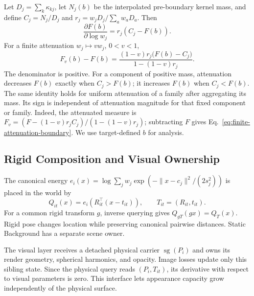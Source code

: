 Let $D_j=\sum_k\kappa_{kj}$, let $N_j(b)$ be the interpolated pre-boundary kernel mass, and define
$C_j=N_j/D_j$ and $r_j=w_jD_j/\sum_a w_aD_a$.
Then
\begin{equation}
\frac{\partial F(b)}{\partial\log w_j}=r_j(C_j-F(b)).
\label{eq:attenuation-sign-boundary}
\end{equation}
For a finite attenuation $w_j\mapsto vw_j$, $0<v<1$,
\begin{equation}
F_v(b)-F(b)=
\frac{(1-v)r_j\bigl(F(b)-C_j\bigr)}{1-(1-v)r_j}.
\label{eq:finite-attenuation-boundary}
\end{equation}
The denominator is positive. For a component of positive mass, attenuation decreases $F(b)$ exactly
when $C_j>F(b)$; it increases $F(b)$ when $C_j<F(b)$.
The same identity holds for uniform attenuation of a family after aggregating its mass.
Its sign is independent of attenuation magnitude for that fixed component or family.
Indeed, the attenuated measure is $F_v=(F-(1-v)r_jC_j)/(1-(1-v)r_j)$;
subtracting $F$ gives Eq.~\ref{eq:finite-attenuation-boundary}.
We use target-defined $b$ for analysis.

\subsection{Rigid Composition and Visual Ownership}

The canonical energy $e_i(x)=\log\sum_j w_j\exp(-\|x-c_j\|^2/(2s_j^2))$ is placed in the world by
\begin{equation}
Q_{it}(x)=e_i\!\left(R_{it}^{\top}(x-t_{it})\right),
\qquad T_{it}=(R_{it},t_{it}).
\label{eq:authority-query}
\end{equation}
For a common rigid transform $g$, inverse querying gives $Q_{gT}(gx)=Q_T(x)$.
Rigid pose changes location while preserving canonical pairwise distances.
Static Background has a separate scene owner.

The visual layer receives a detached physical carrier $\operatorname{sg}(P_i)$ and owns its render geometry,
spherical harmonics, and opacity. Image losses update only this sibling state.
Since the physical query reads $(P_i,T_{it})$, its derivative with respect to visual parameters is zero.
This interface lets appearance capacity grow independently of the physical surface.
